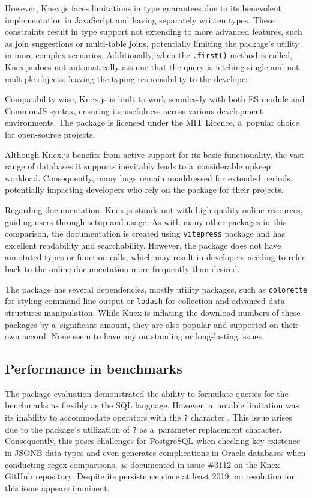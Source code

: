 However, Knex.js faces limitations in type guarantees due to its benevolent
implementation in JavaScript and having separately written types. These
constraints result in type support not extending to more advanced features, such
as join suggestions or multi-table joins, potentially limiting the package's
utility in more complex scenarios. Additionally, when the \texttt{.first()}
method is called, Knex.js does not automatically assume that the query is
fetching single and not multiple objects, leaving the typing responsibility to
the developer.

Compatibility-wise, Knex.js is built to work seamlessly with both ES module and
CommonJS syntax, ensuring its usefulness across various development
environments. The package is licensed under the MIT Licence, a~popular choice
for open-source projects.

Although Knex.js benefits from active support for its basic functionality, the
vast range of databases it supports inevitably leads to a~considerable upkeep
workload. Consequently, many bugs remain unaddressed for extended periods,
potentially impacting developers who rely on the package for their projects.

Regarding documentation, Knex.js stands out with high-quality online resources,
guiding users through setup and usage. As with many other packages in this
comparison, the documentation is created using \texttt{vitepress} package and
has excellent readability and searchability. However, the package does not have
annotated types or function calls, which may result in developers needing to
refer back to the online documentation more frequently than desired.

The package has several dependencies, mostly utility packages, such as
\texttt{colorette} for styling command line output or \texttt{lodash} for
collection and advanced data structures manipulation. While Knex is inflating
the download numbers of these packages by a~significant amount, they are also
popular and supported on their own accord. None seem to have any outstanding or
long-lasting issues.

\subsection*{Performance in benchmarks}

The package evaluation demonstrated the ability to formulate queries for the
benchmarks as flexibly as the SQL language. However, a~notable limitation was
its inability to accommodate operators with the \texttt{?} character
\cite{knexJSONIssue1}. This issue arises due to the package's utilization of
\texttt{?} as a~parameter replacement character. Consequently, this poses
challenges for PostgreSQL when checking key existence in JSONB data types and
even generates complications in Oracle databases when conducting regex
comparisons, as documented in issue \#3112 \cite{knexJSONIssue2} on the Knex
GitHub repository. Despite its persistence since at least 2019, no resolution
for this issue appears imminent.


